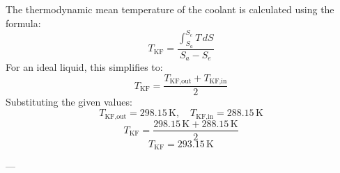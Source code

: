 The thermodynamic mean temperature of the coolant is calculated using the formula:  
\[
T_{\text{KF}} = \frac{\int_{S_a}^{S_e} T \, dS}{S_a - S_e}
\]  
For an ideal liquid, this simplifies to:  
\[
T_{\text{KF}} = \frac{T_{\text{KF,out}} + T_{\text{KF,in}}}{2}
\]  
Substituting the given values:  
\[
T_{\text{KF,out}} = 298.15 \, \text{K}, \quad T_{\text{KF,in}} = 288.15 \, \text{K}
\]  
\[
T_{\text{KF}} = \frac{298.15 \, \text{K} + 288.15 \, \text{K}}{2}
\]  
\[
T_{\text{KF}} = 293.15 \, \text{K}
\]  

---